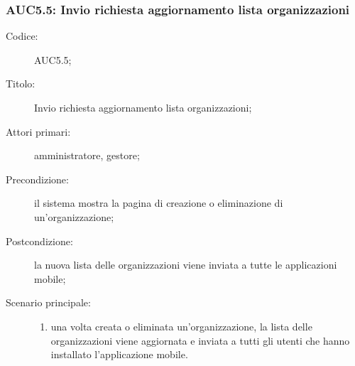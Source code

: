 \documentclass[../../../analisi-dei-requisiti.tex]{subfiles}
\begin{document}
\subsubsection{AUC5.5: Invio richiesta aggiornamento lista organizzazioni}%
\label{subs:AUC5.5}
\begin{description}
  \item[Codice:] AUC5.5;
  \item[Titolo:] Invio richiesta aggiornamento lista organizzazioni;
  \item[Attori primari:] amministratore, gestore;
  \item[Precondizione:] il sistema mostra la pagina di creazione o eliminazione di un'organizzazione;
  \item[Postcondizione:] la nuova lista delle organizzazioni viene inviata a tutte le applicazioni mobile;
  \item[Scenario principale:]
        \begin{enumerate}
          \item una volta creata o eliminata un'organizzazione, la lista delle organizzazioni viene aggiornata e inviata a tutti gli utenti che hanno installato l'applicazione mobile.
        \end{enumerate}
\end{description}
\end{document}
